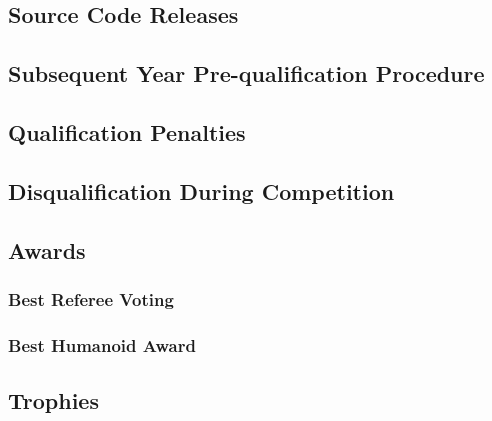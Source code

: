 \subsection{Source Code Releases}
\label{sec:code_release}

\subsection{Subsequent Year Pre-qualification Procedure}
\label{sec:pre_qualification}

\subsection{Qualification Penalties}
\label{sec:qualification_penalties}

\subsection{Disqualification During Competition}
\label{sec:disqualification_during_competition}

\subsection{Awards}
\label{awards}

\subsubsection{Best Referee Voting}
\subsubsection{Best Humanoid Award}

\subsection{Trophies}
\label{trophies}

